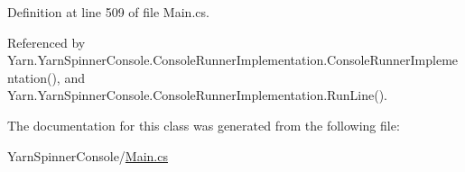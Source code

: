 Definition at line 509 of file Main.\-cs.



Referenced by Yarn.\-Yarn\-Spinner\-Console.\-Console\-Runner\-Implementation.\-Console\-Runner\-Implementation(), and Yarn.\-Yarn\-Spinner\-Console.\-Console\-Runner\-Implementation.\-Run\-Line().



The documentation for this class was generated from the following file\-:\begin{DoxyCompactItemize}
\item 
Yarn\-Spinner\-Console/\hyperlink{a00307}{Main.\-cs}\end{DoxyCompactItemize}
